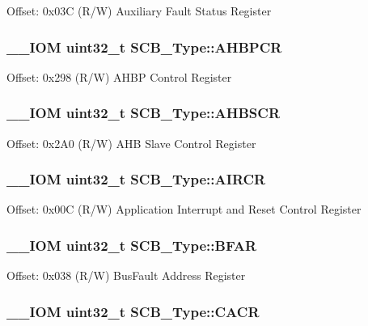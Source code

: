 Offset\-: 0x03\-C (R/\-W) Auxiliary Fault Status Register \hypertarget{struct_s_c_b___type_a0d53bcea294422b5b4ecfdcd9cdc1773}{
\subsubsection[{A\-H\-B\-P\-C\-R}]{\setlength{\rightskip}{0pt plus 5cm}\-\_\-\-\_\-\-I\-O\-M uint32\-\_\-t S\-C\-B\-\_\-\-Type\-::\-A\-H\-B\-P\-C\-R}}\label{struct_s_c_b___type_a0d53bcea294422b5b4ecfdcd9cdc1773}
Offset\-: 0x298 (R/\-W) A\-H\-B\-P Control Register \hypertarget{struct_s_c_b___type_a8c9d9eac30594dd061d34cfaacd5e4bb}{
\subsubsection[{A\-H\-B\-S\-C\-R}]{\setlength{\rightskip}{0pt plus 5cm}\-\_\-\-\_\-\-I\-O\-M uint32\-\_\-t S\-C\-B\-\_\-\-Type\-::\-A\-H\-B\-S\-C\-R}}\label{struct_s_c_b___type_a8c9d9eac30594dd061d34cfaacd5e4bb}
Offset\-: 0x2\-A0 (R/\-W) A\-H\-B Slave Control Register \hypertarget{struct_s_c_b___type_ad3e5b8934c647eb1b7383c1894f01380}{
\subsubsection[{A\-I\-R\-C\-R}]{\setlength{\rightskip}{0pt plus 5cm}\-\_\-\-\_\-\-I\-O\-M uint32\-\_\-t S\-C\-B\-\_\-\-Type\-::\-A\-I\-R\-C\-R}}\label{struct_s_c_b___type_ad3e5b8934c647eb1b7383c1894f01380}
Offset\-: 0x00\-C (R/\-W) Application Interrupt and Reset Control Register \hypertarget{struct_s_c_b___type_a3f8e7e58be4e41c88dfa78f54589271c}{
\subsubsection[{B\-F\-A\-R}]{\setlength{\rightskip}{0pt plus 5cm}\-\_\-\-\_\-\-I\-O\-M uint32\-\_\-t S\-C\-B\-\_\-\-Type\-::\-B\-F\-A\-R}}\label{struct_s_c_b___type_a3f8e7e58be4e41c88dfa78f54589271c}
Offset\-: 0x038 (R/\-W) Bus\-Fault Address Register \hypertarget{struct_s_c_b___type_a51f9bd107a4e1d46ba647384e5c825b5}{
\subsubsection[{C\-A\-C\-R}]{\setlength{\rightskip}{0pt plus 5cm}\-\_\-\-\_\-\-I\-O\-M uint32\-\_\-t S\-C\-B\-\_\-\-Type\-::\-C\-A\-C\-R}}\label{struct_s_c_b___type_a51f9bd107a4e1d46ba647384e5c825b5}
